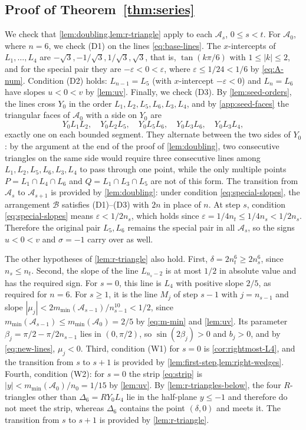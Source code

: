 \subsection{\texorpdfstring{Proof of Theorem~\ref{thm:series}}{Proof of the theorem}}

We check that \cref{lem:doubling,lem:r-triangle} apply to each $\mathcal A_s$, $0\le s<t$.
For $\mathcal A_0$, where $n=6$, we check (D1) on the lines \eqref{eq:base-lines}. The $x$-intercepts of $L_1,\ldots,L_4$ are $-\sqrt3,-1/\sqrt3,1/\sqrt3,\sqrt3$, that is, $\tan(k\pi/6)$ with $1\le|k|\le2$, and for the special pair they are $-\varepsilon<0<\varepsilon$, where $\varepsilon\le1/24<1/6$ by \eqref{eq:A-num}.
Condition (D2) holds: $L_{n-1}=L_5$ (with $x$-intercept $-\varepsilon<0$) and $L_n=L_6$ have slopes $u<0<v$ by \cref{lem:uv}.
Finally, we check (D3). By \cref{lem:seed-orders}, the lines cross $Y_0$ in the order $L_1,L_2,L_5,L_6,L_3,L_4$, and by \cref{app:seed-faces} the triangular faces of $\mathcal A_0$ with a side on $Y_0$ are
\[
Y_0L_1L_2,\quad Y_0L_2L_5,\quad Y_0L_5L_6,\quad Y_0L_3L_6,\quad Y_0L_3L_4,
\]
exactly one on each bounded segment.
They alternate between the two sides of $Y_0$: by the argument at the end of the proof of \cref{lem:doubling}, two consecutive triangles on the same side would require three consecutive lines among $L_1,L_2,L_5,L_6,L_3,L_4$ to pass through one point, while the only multiple points $P=L_1\cap L_4\cap L_6$ and $Q=L_1\cap L_3\cap L_5$ are not of this form.
The transition from $\mathcal A_s$ to $\mathcal A_{s+1}$ is provided by \cref{lem:doubling}: under condition \eqref{eq:special-slopes}, the arrangement $\mathcal B$ satisfies (D1)--(D3) with $2n$ in place of $n$. At step $s$, condition \eqref{eq:special-slopes} means $\varepsilon<1/2n_s$, which holds since $\varepsilon=1/4n_t\le1/4n_s<1/2n_s$.
Therefore the original pair $L_5,L_6$ remains the special pair in all $\mathcal A_s$, so the signs $u<0<v$ and $\sigma=-1$ carry over as well.

The other hypotheses of \cref{lem:r-triangle} also hold.
First, $\delta=2n_t^6\ge2n_s^6$, since $n_s\le n_t$.
Second, the slope of the line $L_{n_s-2}$ is at most $1/2$ in absolute value and has the required sign.
For $s=0$, this line is $L_4$ with positive slope $2/5$, as required for $n=6$.
For $s\ge1$, it is the line $M_j$ of step $s-1$ with $j=n_{s-1}$ and slope $|\mu_j|<2m_{\min}(\mathcal A_{s-1})/n_{s-1}^{10}<1/2$, since $m_{\min}(\mathcal A_{s-1})\le m_{\min}(\mathcal A_0)=2/5$ by \eqref{eq:m-min} and \cref{lem:uv}.
Its parameter $\beta_j=\pi/2-\pi/2n_{s-1}$ lies in $(0,\pi/2)$, so $\sin(2\beta_j)>0$ and $b_j>0$, and by \eqref{eq:new-lines}, $\mu_j<0$.
Third, condition (W1) for $s=0$ is \cref{cor:rightmost-L4}, and the transition from $s$ to $s+1$ is provided by \cref{lem:first-step,lem:right-wedges}.
Fourth, condition (W2): for $s=0$ the strip \eqref{eq:strip} is $|y|<m_{\min}(\mathcal A_0)/n_0=1/15$ by \cref{lem:uv}. By \cref{lem:r-triangles-below}, the four $R$-triangles other than $\Delta_6=RY_0L_4$ lie in the half-plane $y\le-1$ and therefore do not meet the strip, whereas $\Delta_6$ contains the point $(\delta,0)$ and meets it. The transition from $s$ to $s+1$ is provided by \cref{lem:r-triangle}.

